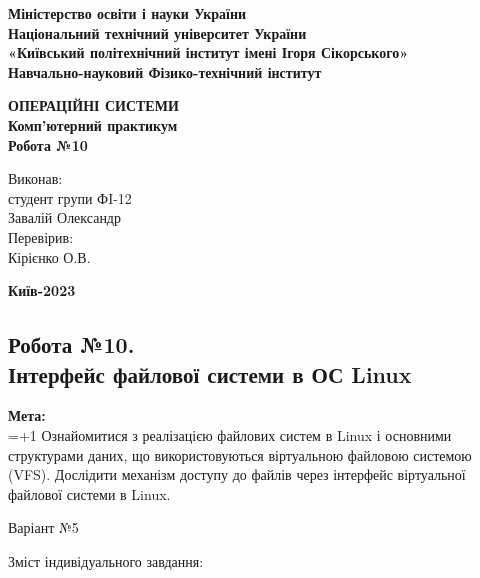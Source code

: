 \documentclass[a4paper,12pt]{article}
\begin{document}
    \pagestyle{fancy}
    \fancyhead{}
    \begin{center}
        \large{\textbf{Міністерство освіти і науки України\\
                Національний технічний університет України\\
                «Київський політехнічний інститут імені Ігоря Сікорського»\\
                Навчально-науковий Фізико-технічний інститут}}\\
        \hfill \break \hfill \break \hfill\break \hfill \break \hfill \break \hfill \break \hfill \break
        \hfill \break \hfill \break \hfill \break
        \begin{center}
            \normalsize{\textbf{ОПЕРАЦІЙНІ СИСТЕМИ\\
            Комп’ютерний практикум\\
            Робота №10}}
        \end{center}
    \end{center}
    \hfill \break \hfill \break \hfill \break \hfill \break \hfill \break \hfill \break \hfill \break
    \hfill \break \hfill \break \hfill \break \hfill \break 
    \begin{flushright}
        \large{ \hspace{35pt} Виконав:\\
            студент групи ФI-12\\
            Завалій Олександр\\} 
        \large{ \hspace{35pt} Перевірив:\\
        Кірієнко О.В.} 
    \end{flushright}
    \hfill \break \hfill \break \hfill \break \hfill \break \hfill \break \hfill \break \hfill \break
    \hfill \break
    \begin{center} \textbf{Київ-2023} \end{center}
    \thispagestyle{empty}

\newpage
    \begin{center}
        \section*{\bfseries{Робота №10.\\
        Інтерфейс файлової системи в ОС Linux }}
    \end{center}
    \textbf{Мета:} \\
    \hangindent=1.5cm 
    \hangafter=+1 \noindent
    Ознайомитися з реалізацією файлових систем в Linux і основними структурами даних, що використовуються віртуальною файловою системою
    (VFS). Дослідити механізм доступу до файлів через інтерфейс віртуальної файлової системи в Linux. \\
    \begin{center}
        \Large{Варіант №5}
    \end{center}
    Зміст індивідуального завдання: 
\end{document}
